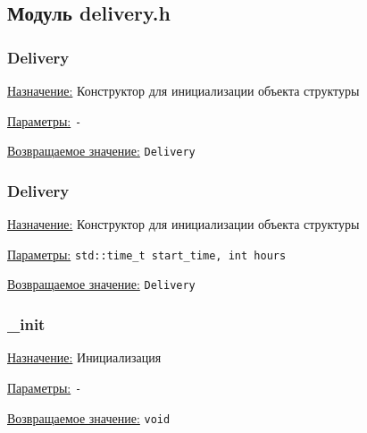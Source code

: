 \subsection{Модуль delivery.h}


\subsubsection{Delivery}

\underline{Назначение:} Конструктор для инициализации объекта структуры

\underline{Параметры:} \verb|-|

\underline{Возвращаемое значение:} \verb|Delivery|


\subsubsection{Delivery}

\underline{Назначение:} Конструктор для инициализации объекта структуры

\underline{Параметры:} \verb|std::time_t start_time, int hours|

\underline{Возвращаемое значение:} \verb|Delivery|


\subsubsection{\_init} 

\underline{Назначение:} Инициализация

\underline{Параметры:} \verb|-|

\underline{Возвращаемое значение:} \verb|void|

